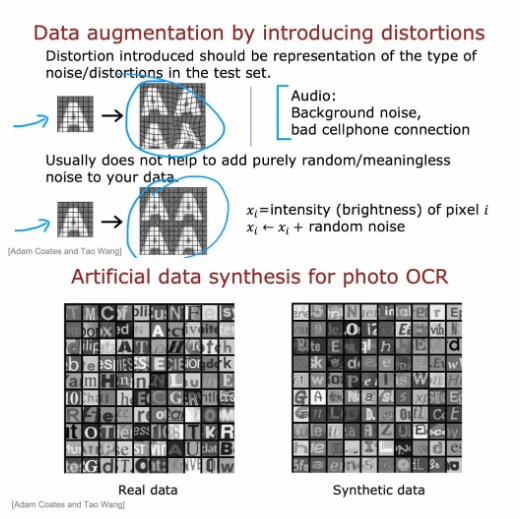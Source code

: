 \includegraphics*[width=\textwidth]{images/10.22}
\includegraphics*[width=\textwidth]{images/10.23}
